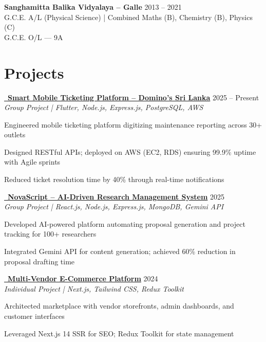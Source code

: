 \documentclass[letterpaper,10.8pt]{article}
\newenvironment{resume_list}{
  \vspace{-1pt}
  \begin{itemize}[itemsep=2pt, leftmargin=14pt]
}{
  \end{itemize}\vspace{-2pt}
}
\begin{document}
\vspace{2pt}
\noindent\textbf{Sanghamitta Balika Vidyalaya – Galle} \hfill 2013 – 2021\\
\noindent G.C.E. A/L (Physical Science) | Combined Maths (B), Chemistry (B), Physics (C)\\
\noindent G.C.E. O/L — 9A

\section{Projects}
\vspace{-2pt}

\newcommand{\project}[5]{%
  \noindent
  \href{#1}{\faGithub~\textbf{#2}} \hfill #3\\[-1pt]
  \textit{#4}\\[-5pt]
  \begin{resume_list}
    #5
  \end{resume_list}
  \vspace{4pt}
}

\project{https://github.com/fixpoint-tech}
{Smart Mobile Ticketing Platform – Domino's Sri Lanka}
{2025 – Present}
{Group Project | Flutter, Node.js, Express.js, PostgreSQL, AWS}{
  \item Engineered mobile ticketing platform digitizing maintenance reporting across 30+ outlets
  \item Designed RESTful APIs; deployed on AWS (EC2, RDS) ensuring 99.9\% uptime with Agile sprints
  \item Reduced ticket resolution time by 40\% through real-time notifications
}

\vspace{8pt}

\project{https://github.com/Chandima0406/NovaScript.git}
{NovaScript – AI-Driven Research Management System}
{2025}
{Group Project | React.js, Node.js, Express.js, MongoDB, Gemini API}{
  \item Developed AI-powered platform automating proposal generation and project tracking for 100+ researchers
  \item Integrated Gemini API for content generation; achieved 60\% reduction in proposal drafting time
}

\vspace{8pt}

\project{https://github.com/vindyakodithuwakku02/gocart.git}
{Multi-Vendor E-Commerce Platform}
{2024}
{Individual Project | Next.js, Tailwind CSS, Redux Toolkit}{
  \item Architected marketplace with vendor storefronts, admin dashboards, and customer interfaces
  \item Leveraged Next.js 14 SSR for SEO; Redux Toolkit for state management
}
\end{document}
